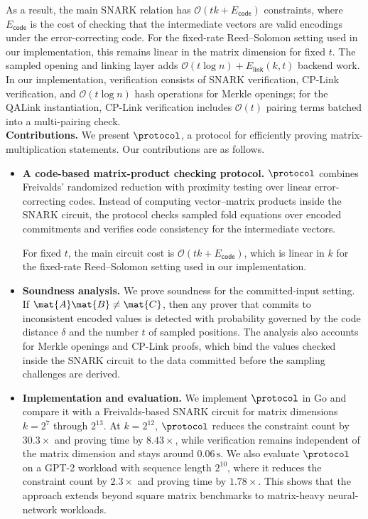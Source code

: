 As a result, the main SNARK relation has
\(\mathcal{O}(tk+E_{\mathsf{code}})\) constraints, where
\(E_{\mathsf{code}}\) is the cost of checking that the
intermediate vectors are valid encodings under the error-correcting code. For the fixed-rate Reed--Solomon setting used in our implementation,
this remains linear in the matrix dimension for fixed \(t\).  The sampled
opening and linking layer adds
\(\mathcal{O}(t\log n)+E_{\mathsf{link}}(k,t)\) backend work.  In our
implementation, verification consists of SNARK verification, CP-Link
verification, and \(\mathcal{O}(t\log n)\) hash operations for Merkle openings;
for the QALink instantiation, CP-Link verification includes
\(\mathcal{O}(t)\) pairing terms batched into a multi-pairing check.\\


\noindent\textbf{Contributions.}
We present \(\protocol\), a protocol for efficiently proving
matrix-multiplication statements.  Our contributions are as follows.
\begin{itemize}
  \item \textbf{A code-based matrix-product checking protocol.}
  \(\protocol\) combines Freivalds' randomized reduction with proximity testing
  over linear error-correcting codes.  Instead of computing vector--matrix
  products inside the SNARK circuit, the protocol checks sampled fold equations
  over encoded commitments and verifies code consistency for the intermediate
  vectors. 

  For fixed \(t\), the main circuit cost is
  \(\mathcal{O}(tk+E_{\mathsf{code}})\), which is linear in \(k\) for the
  fixed-rate Reed--Solomon setting used in our implementation.

  \item \textbf{Soundness analysis.}
  We prove soundness for the committed-input setting.  If
  \(\mat{A}\mat{B}\ne\mat{C}\), then any prover that commits to inconsistent
  encoded values is detected with probability governed by the code distance
  \(\delta\) and the number \(t\) of sampled positions.  The analysis also
  accounts for Merkle openings and CP-Link proofs, which bind the values
  checked inside the SNARK circuit to the data committed before the sampling
  challenges are derived.

  \item \textbf{Implementation and evaluation.}
  We implement \(\protocol\) in Go and compare it with a Freivalds-based SNARK
  circuit for matrix dimensions \(k=2^7\) through \(2^{13}\).  At
\(k=2^{12}\), \(\protocol\) reduces the constraint count by \(30.3\times\)
and proving time by \(8.43\times\), while verification remains independent of
the matrix dimension and stays around \(0.06\,\text{s}\).  We also evaluate
  \(\protocol\) on a GPT-2 workload with sequence length \(2^{10}\), where it
  reduces the constraint count by \(2.3\times\) and proving time by
  \(1.78\times\).  This shows that the approach extends beyond square matrix
  benchmarks to matrix-heavy neural-network workloads.
\end{itemize}

